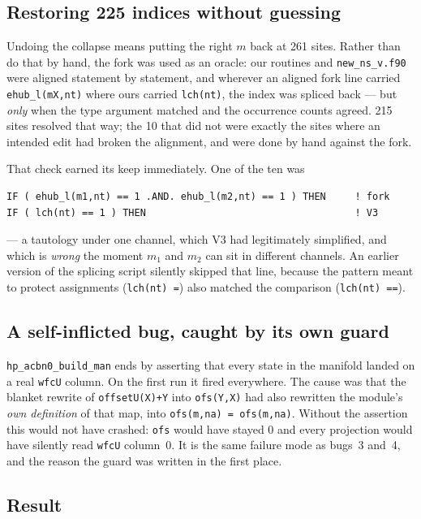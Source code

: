 \documentclass[11pt,a4paper]{article}
\newcommand{\C}[1]{\texttt{\small #1}}
\begin{document}
\subsection{Restoring 225 indices without guessing}

Undoing the collapse means putting the right $m$ back at 261 sites. Rather
than do that by hand, the fork was used as an oracle: our routines and
\C{new_ns_v.f90} were aligned statement by statement, and wherever an aligned
fork line carried \C{ehub_l(mX,nt)} where ours carried \C{lch(nt)}, the index
was spliced back --- but \emph{only} when the type argument matched and the
occurrence counts agreed. 215 sites resolved that way; the 10 that did not
were exactly the sites where an intended edit had broken the alignment, and
were done by hand against the fork.

That check earned its keep immediately. One of the ten was

\begin{lstlisting}
IF ( ehub_l(m1,nt) == 1 .AND. ehub_l(m2,nt) == 1 ) THEN     ! fork
IF ( lch(nt) == 1 ) THEN                                    ! V3
\end{lstlisting}

\noindent
--- a tautology under one channel, which V3 had legitimately simplified, and
which is \emph{wrong} the moment $m_1$ and $m_2$ can sit in different
channels. An earlier version of the splicing script silently skipped that
line, because the pattern meant to protect assignments (\C{lch(nt) =})
also matched the comparison (\C{lch(nt) ==}).

\subsection{A self-inflicted bug, caught by its own guard}

\C{hp_acbn0_build_man} ends by asserting that every state in the manifold
landed on a real \C{wfcU} column. On the first run it fired everywhere. The
cause was that the blanket rewrite of \C{offsetU(X)+Y} into \C{ofs(Y,X)} had
also rewritten the module's \emph{own definition} of that map, into
\C{ofs(m,na) = ofs(m,na)}. Without the assertion this would not have crashed:
\C{ofs} would have stayed 0 and every projection would have silently read
\C{wfcU} column~0. It is the same failure mode as bugs~3 and~4, and the reason
the guard was written in the first place.

\subsection{Result}
\end{document}
